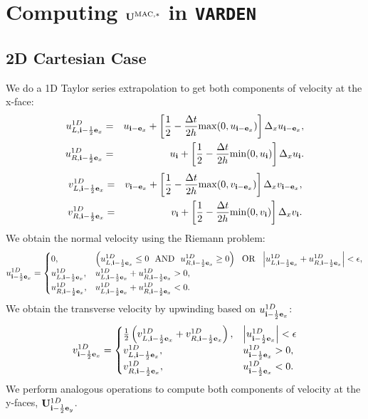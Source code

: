 \section{Computing ${\bf U}^{\rm MAC,*}$ in {\tt VARDEN}}

\subsection{2D Cartesian Case}
We do a 1D Taylor series extrapolation to get both components of velocity at the x-face:
\begin{eqnarray}
u_{L,{\bf i}-\frac{1}{2}{\bf e}_x}^{1D} &=& u_{{\bf i}-{\bf e}_x} + \left[\frac{1}{2} - \frac{\Delta t}{2h}{\rm max}(0,u_{{\bf i}-{\bf e}_x})\right]\Delta_xu_{{\bf i}-{\bf e}_x}, \label{varden U_L^1D} \\
u_{R,{\bf i}-\frac{1}{2}{\bf e}_x}^{1D} &=& u_{{\bf i}} + \left[\frac{1}{2} - \frac{\Delta t}{2h}{\rm min}(0,u_{{\bf i}})\right]\Delta_xu_{{\bf i}}.
\end{eqnarray}
\begin{eqnarray}
v_{L,{\bf i}-\frac{1}{2}{\bf e}_x}^{1D} &=& v_{{\bf i}-{\bf e}_x} + \left[\frac{1}{2} - \frac{\Delta t}{2h}{\rm max}(0,v_{{\bf i}-{\bf e}_x})\right]\Delta_xv_{{\bf i}-{\bf e}_x}, \label{varden U_L^1D} \\
v_{R,{\bf i}-\frac{1}{2}{\bf e}_x}^{1D} &=& v_{{\bf i}} + \left[\frac{1}{2} - \frac{\Delta t}{2h}{\rm min}(0,v_{{\bf i}})\right]\Delta_xv_{{\bf i}}.
\end{eqnarray}
We obtain the normal velocity using the Riemann problem:
\begin{equation}
u_{{\bf i}-\frac{1}{2}{\bf e}_x}^{1D} =
\begin{cases}
0, & \left(u_{L,{\bf i}-\frac{1}{2}{\bf e}_x}^{1D} \le 0 ~~ {\rm AND} ~~ u_{R,{\bf i}-\frac{1}{2}{\bf e}_x}^{1D} \ge 0\right) ~~ {\rm OR} ~~ \left|u_{L,{\bf i}-\frac{1}{2}{\bf e}_x}^{1D} + u_{R,{\bf i}-\frac{1}{2}{\bf e}_x}^{1D}\right| < \epsilon, \\
u_{L,{\bf i}-\frac{1}{2}{\bf e}_x}^{1D}, & u_{L,{\bf i}-\frac{1}{2}{\bf e}_x}^{1D} + u_{R,{\bf i}-\frac{1}{2}{\bf e}_x}^{1D} > 0, \\
u_{R,{\bf i}-\frac{1}{2}{\bf e}_x}^{1D}, & u_{L,{\bf i}-\frac{1}{2}{\bf e}_x}^{1D} + u_{R,{\bf i}-\frac{1}{2}{\bf e}_x}^{1D} < 0.
\end{cases}
\end{equation}
We obtain the transverse velocity by upwinding based on
$u_{{\bf i}-\frac{1}{2}{\bf e}_x}^{1D}$:
\begin{equation}
v_{{\bf i}-\frac{1}{2}{\bf e}_x}^{1D} =
\begin{cases}
\frac{1}{2}\left(v_{L,{\bf i}-\frac{1}{2}{\bf e}_x}^{1D} + v_{R,{\bf i}-\frac{1}{2}{\bf e}_x}^{1D}\right), & \left|u_{{\bf i}-\frac{1}{2}{\bf e}_x}^{1D}\right| < \epsilon \\
v_{L,{\bf i}-\frac{1}{2}{\bf e}_x}^{1D}, & u_{{\bf i}-\frac{1}{2}{\bf e}_x}^{1D} > 0, \\
v_{R,{\bf i}-\frac{1}{2}{\bf e}_x}^{1D}, & u_{{\bf i}-\frac{1}{2}{\bf e}_x}^{1D} < 0.
\end{cases}\label{Transverse Velocity Riemann Problem}
\end{equation}
We perform analogous operations to compute both components of velocity
at the y-faces, ${\bf U}_{{\bf i}-\frac{1}{2}{\bf e}_y}^{1D}$. \\

